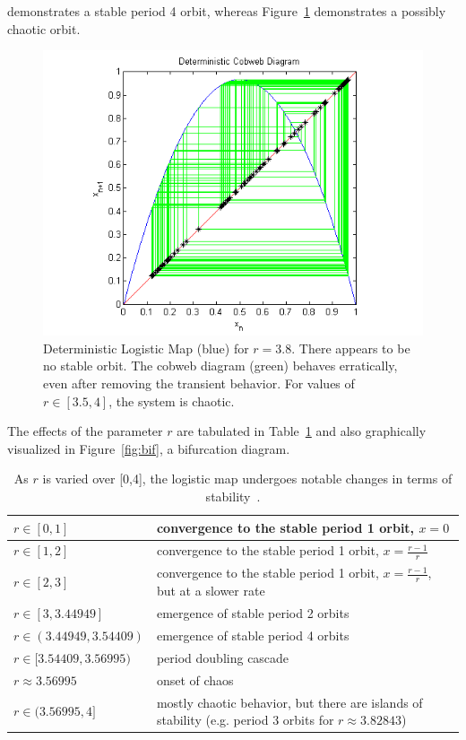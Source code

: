 demonstrates a stable period 4 orbit, whereas Figure~\ref{fig:detlogunstable}
demonstrates a possibly chaotic orbit. 
\begin{figure}[!h]
\caption[Deterministic logistic map, erratic orbit]{Deterministic
  Logistic Map (blue) for $r=3.8$. There appears to be no
  stable orbit. The cobweb diagram (green) behaves erratically, even
  after removing the transient behavior. For values of $r \in
  [3.5,4]$, the system is chaotic.}\label{fig:detlogunstable}
	\begin{center}
		\includegraphics[scale=0.75]{figs/chaos.png}
	\end{center}
\end{figure} 
The effects of the parameter $r$ are
tabulated in Table~\ref{tbl:bif} and also graphically visualized in
Figure~\ref{fig:bif}, a bifurcation diagram. 
\begin {table}[!h]
\begin{center}
\caption[Behavior of the deterministic map as $r$ is varied]{As $r$ is
varied over [0,4], the logistic map undergoes notable changes in terms
of stability~\cite{may}.}\label{tbl:bif}
\begin{tabular}{ | p{4cm}| p{8cm}|}   \hline
$r \in [0,1]$ & convergence to the stable period 1 orbit, $x=0$ \\ \hline
$r \in [1,2]$ & convergence to the stable period 1 orbit, $x = \frac{r-1}{r}$\\ \hline
$r \in [2,3]$ & convergence to the stable period 1 orbit, $x = \frac{r-1}{r}$, but at a slower rate\\ \hline
$r \in [3,3.44949]$ & emergence of stable period 2 orbits\\ \hline
$r \in (3.44949, 3.54409)$ & emergence of stable period 4 orbits\\ \hline
$r \in [3.54409,3.56995)$ & period doubling cascade\\ \hline
$ r \approx 3.56995 $ & onset of chaos\\\hline
$r \in (3.56995,4]$ & mostly chaotic behavior, but there are islands of
stability (e.g. period 3 orbits for $r \approx 3.82843$) \\\hline
\end{tabular}
\end{center}
\end {table}
